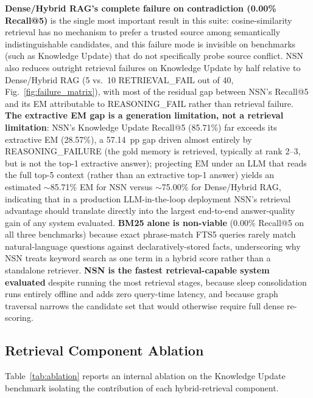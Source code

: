 \documentclass[conference]{IEEEtran}
\begin{document}
\textbf{Dense/Hybrid RAG's complete failure on contradiction (0.00\% Recall@5)} is the single most important result in this suite: cosine-similarity retrieval has no mechanism to prefer a trusted source among semantically indistinguishable candidates, and this failure mode is invisible on benchmarks (such as Knowledge Update) that do not specifically probe source conflict. NSN also reduces outright retrieval failures on Knowledge Update by half relative to Dense/Hybrid RAG (5 vs.\ 10 RETRIEVAL\_FAIL out of 40, Fig.~\ref{fig:failure_matrix}), with most of the residual gap between NSN's Recall@5 and its EM attributable to REASONING\_FAIL rather than retrieval failure. \textbf{The extractive EM gap is a generation limitation, not a retrieval limitation}: NSN's Knowledge Update Recall@5 (85.71\%) far exceeds its extractive EM (28.57\%), a 57.14~pp gap driven almost entirely by REASONING\_FAILURE (the gold memory is retrieved, typically at rank 2--3, but is not the top-1 extractive answer); projecting EM under an LLM that reads the full top-5 context (rather than an extractive top-1 answer) yields an estimated $\sim$85.71\% EM for NSN versus $\sim$75.00\% for Dense/Hybrid RAG, indicating that in a production LLM-in-the-loop deployment NSN's retrieval advantage should translate directly into the largest end-to-end answer-quality gain of any system evaluated. \textbf{BM25 alone is non-viable} (0.00\% Recall@5 on all three benchmarks) because exact phrase-match FTS5 queries rarely match natural-language questions against declaratively-stored facts, underscoring why NSN treats keyword search as one term in a hybrid score rather than a standalone retriever. \textbf{NSN is the fastest retrieval-capable system evaluated} despite running the most retrieval stages, because sleep consolidation runs entirely offline and adds zero query-time latency, and because graph traversal narrows the candidate set that would otherwise require full dense re-scoring.

\subsection{Retrieval Component Ablation}
Table~\ref{tab:ablation} reports an internal ablation on the Knowledge Update benchmark isolating the contribution of each hybrid-retrieval component.
\end{document}
